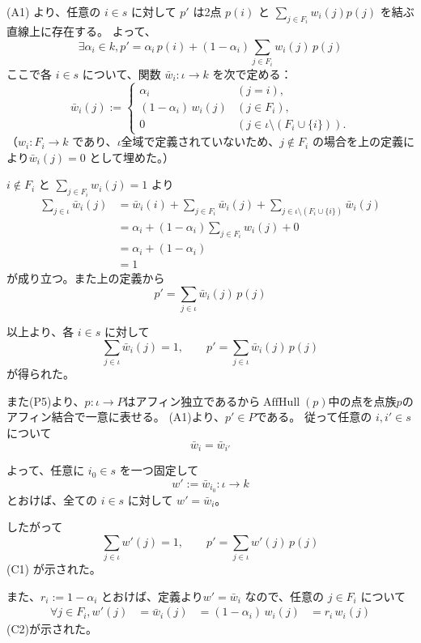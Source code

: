 \documentclass[a4paper,12pt]{bxjsbook}
\makeatletter
\newlength{\customindent}
\theoremstyle{theorem}
\renewenvironment{proof}[1][\proofname]{%
  \par\pushQED{\qed}%
  \normalfont
  \topsep6\p@\@plus6\p@\relax
  \list{}{%
    \leftmargin=\customindent
    \rightmargin=0pt
    \labelwidth=0pt
    \labelsep=0pt
    \itemindent=0pt
    \listparindent=0pt
    \parsep=0pt
  }%
  \item[\itshape #1\@addpunct{.}\hspace{0.5em}]%
  \setlength{\displayindent}{\customindent}%
  \setlength{\displaywidth}{\dimexpr\linewidth-\customindent\relax}%
  \ignorespaces
}{%
  \popQED\endlist\@endpefalse
}
\DeclareMathOperator{\AffHull}{AffHull}
\makeatother
\begin{document}
    \begin{proof}  
        (A1) より、任意の $i\in s$ に対して $p'$ は2点 $p(i)$ と $\sum_{j \in F_i} w_i(j)p(j)$ を結ぶ直線上に存在する。
        よって、
        \[
        \exists \alpha_i\in k, p'=\alpha_i\,p(i)+(1-\alpha_i)\sum_{j\in F_i} w_i(j)\,p(j)
        \]
        ここで各 $i\in s$ について、関数 $\bar w_i:\iota\to k$ を次で定める：
        \[
        \bar w_i(j):=
        \begin{cases}
        \alpha_i & (j=i),\\
        (1-\alpha_i)\,w_i(j) & (j\in F_i),\\
        0 & (j\in\iota\setminus(F_i\cup\{i\})).
        \end{cases}
        \]
        （$w_i: F_i\to k$ であり、$\iota$全域で定義されていないため、$j\notin F_i$ の場合を上の定義により$\bar w_i(j)=0$ として埋めた。）
  
        $i\notin F_i$ と $\sum_{j\in F_i}w_i(j)=1$ より
        \[
        \begin{aligned}
        \sum_{j\in\iota} \bar w_i(j)
            &= \bar w_i(i)+\sum_{j\in F_i} \bar w_i(j)+\sum_{j\in\iota\setminus(F_i\cup\{i\})} \bar w_i(j)\\
            &= \alpha_i + (1-\alpha_i)\sum_{j\in F_i} w_i(j) + 0\\
            &= \alpha_i + (1-\alpha_i)\\
            &= 1
        \end{aligned}
        \]
        が成り立つ。また上の定義から
        \[
        p'=\sum_{j\in\iota} \bar w_i(j)\,p(j)
        \]
  
        以上より、各 $i\in s$ に対して
        \[
        \sum_{j\in\iota} \bar w_i(j)=1,\qquad
        p'=\sum_{j\in\iota} \bar w_i(j)\,p(j)
        \]
        が得られた。
  
        また(P5)より、$p:\iota\to P$はアフィン独立であるから$\AffHull(p)$中の点を点族$p$のアフィン結合で一意に表せる。
        (A1)より、$p'\in P$である。
        従って任意の $i,i'\in s$ について
        \[
        \bar w_i = \bar w_{i'}
        \]
  
        よって、任意に $i_0\in s$ を一つ固定して
        \[
        w' := \bar w_{i_0}:\iota\to k
        \]
        とおけば、全ての $i\in s$ に対して $w'=\bar w_i$。
  
        したがって
        \[
        \sum_{j\in\iota} w'(j)=1,\qquad
        p'=\sum_{j\in\iota} w'(j)\,p(j)
        \]
        (C1) が示された。
  
        また、$r_i:=1-\alpha_i$ とおけば、定義より$w'=\bar w_i$ なので、任意の $j\in F_i$ について
        \[
        \begin{aligned}
            \forall j\in F_i, 
            w'(j) &=\bar w_i(j)
                &=(1-\alpha_i)\,w_i(j)
                &=r_i\,w_i(j)
        \end{aligned}
        \]
        (C2)が示された。
    \end{proof}
\end{document}
